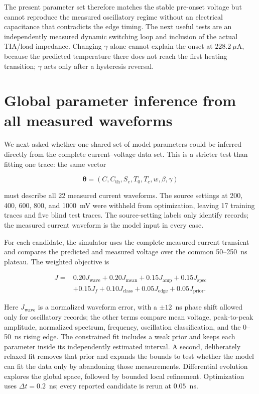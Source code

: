 \documentclass[11pt]{article}
\begin{document}
The present parameter set therefore matches the stable pre-onset voltage but cannot
reproduce the measured oscillatory regime without an electrical capacitance that
contradicts the edge timing. The next useful tests are an independently measured
dynamic switching loop and inclusion of the actual TIA/load impedance. Changing
$\gamma$ alone cannot explain the onset at $228.2~\mu$A, because the predicted
temperature there does not reach the first heating transition; $\gamma$ acts only
after a hysteresis reversal.

\clearpage
\section{Global parameter inference from all measured waveforms}
\label{sec:global_inference}

We next asked whether one shared set of model parameters could be inferred directly
from the complete current--voltage data set. This is a stricter test than fitting one
trace: the same vector

\begin{equation}
\boldsymbol{\theta}=(C,C_{\mathrm{th}},S_e,T_0,T_c,w,\beta,\gamma)
\end{equation}

must describe all 22 measured current waveforms. The source settings at 200, 400,
600, 800, and 1000~mV were withheld from optimization, leaving 17 training traces
and five blind test traces. The source-setting labels only identify records; the
measured current waveform is the model input in every case.

For each candidate, the simulator uses the complete measured current transient and
compares the predicted and measured voltage over the common 50--250~ns plateau. The
weighted objective is

\begin{equation}
\begin{split}
J={}&0.20J_{\mathrm{wave}}+0.20J_{\mathrm{mean}}+0.15J_{\mathrm{amp}}
+0.15J_{\mathrm{spec}}\\
&+0.15J_f+0.10J_{\mathrm{class}}+0.05J_{\mathrm{edge}}+0.05J_{\mathrm{prior}}.
\end{split}
\label{eq:global_objective}
\end{equation}

Here $J_{\mathrm{wave}}$ is a normalized waveform error, with a $\pm12$~ns phase
shift allowed only for oscillatory records; the other terms compare mean voltage,
peak-to-peak amplitude, normalized spectrum, frequency, oscillation classification,
and the 0--50~ns rising edge. The constrained fit includes a weak prior and keeps
each parameter inside its independently estimated interval. A second, deliberately
relaxed fit removes that prior and expands the bounds to test whether the model can
fit the data only by abandoning those measurements. Differential evolution explores
the global space, followed by bounded local refinement. Optimization uses
$\Delta t=0.2$~ns; every reported candidate is rerun at $0.05$~ns.
\end{document}
